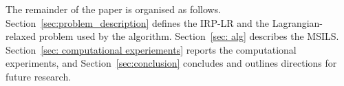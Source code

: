 The remainder of the paper is organised as follows.
Section~\ref{sec:problem_description} defines the IRP-LR and the
Lagrangian-relaxed problem used by the algorithm. Section~\ref{sec: alg}
describes the MSILS. Section~\ref{sec: computational experiements} reports
the computational experiments, and Section~\textcolor{red}{\ref{sec:conclusion}}
concludes and outlines directions for future research.
